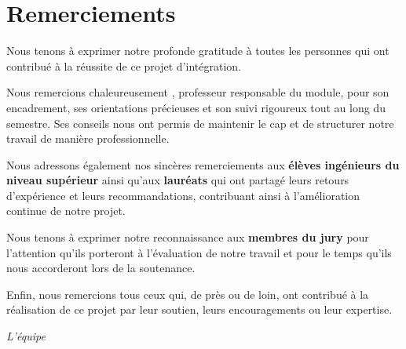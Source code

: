 \chapter*{Remerciements}

Nous tenons à exprimer notre profonde gratitude à toutes les personnes qui ont contribué à la réussite de ce projet d'intégration.

Nous remercions chaleureusement \textbf{\professeur}, professeur responsable du module, pour son encadrement, ses orientations précieuses et son suivi rigoureux tout au long du semestre. Ses conseils nous ont permis de maintenir le cap et de structurer notre travail de manière professionnelle.

Nous adressons également nos sincères remerciements aux \textbf{élèves ingénieurs du niveau supérieur} ainsi qu'aux \textbf{lauréats} qui ont partagé leurs retours d'expérience et leurs recommandations, contribuant ainsi à l'amélioration continue de notre projet.

Nous tenons à exprimer notre reconnaissance aux \textbf{membres du jury} pour l'attention qu'ils porteront à l'évaluation de notre travail et pour le temps qu'ils nous accorderont lors de la soutenance.

Enfin, nous remercions tous ceux qui, de près ou de loin, ont contribué à la réalisation de ce projet par leur soutien, leurs encouragements ou leur expertise.

\bigskip
\begin{flushright}
\textit{L'équipe \teamname}
\end{flushright}
